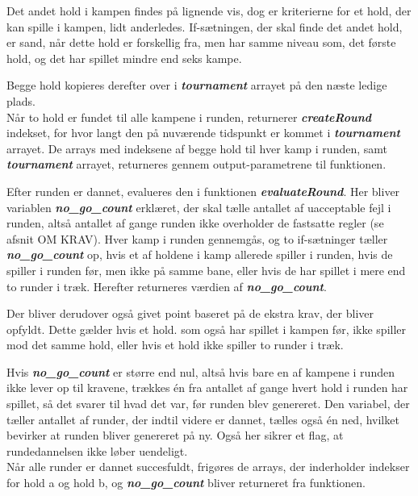 \par
Det andet hold i kampen findes på lignende vis, dog er kriterierne for et hold, der kan spille i kampen, lidt anderledes. If-sætningen, der skal finde det andet hold, er sand, når dette hold er forskellig fra, men har samme niveau som, det første hold, og det har spillet mindre end seks kampe.
\par
Begge hold kopieres derefter over i \textbf{\textit{tournament}} arrayet på den næste ledige plads. \\
Når to hold er fundet til alle kampene i runden, returnerer \textbf{\textit{createRound}} indekset, for hvor langt den på nuværende tidspunkt er kommet i \textbf{\textit{tournament}} arrayet. De arrays med indeksene af begge hold til hver kamp i runden, samt \textbf{\textit{tournament}} arrayet, returneres gennem output-parametrene til funktionen. 
\par
Efter runden er dannet, evalueres den i funktionen \textbf{\textit{evaluateRound}}. Her bliver variablen \textbf{\textit{no\_go\_count}} erklæret, der skal tælle antallet af uacceptable fejl i runden, altså antallet af gange runden ikke overholder de fastsatte regler (se afsnit OM KRAV). Hver kamp i runden gennemgås, og to if-sætninger tæller \textbf{\textit{no\_go\_count}} op, hvis et af holdene i kamp allerede spiller i runden, hvis de spiller i runden før, men ikke på samme bane, eller hvis de har spillet i mere end to runder i træk. Herefter returneres værdien af \textbf{\textit{no\_go\_count}}. 
\par
Der bliver derudover også givet point baseret på de ekstra krav, der bliver opfyldt. Dette gælder hvis et hold. som også har spillet i kampen før, ikke spiller mod det samme hold, eller hvis et hold ikke spiller to runder i træk.
\par
Hvis \textbf{\textit{no\_go\_count}} er større end nul, altså hvis bare en af kampene i runden ikke lever op til kravene, trækkes én fra antallet af gange hvert hold i runden har spillet, så det svarer til hvad det var, før runden blev genereret. Den variabel, der tæller antallet af runder, der indtil videre er dannet, tælles også én ned, hvilket bevirker at runden bliver genereret på ny. Også her sikrer et flag, at rundedannelsen ikke løber uendeligt. \\
Når alle runder er dannet succesfuldt, frigøres de arrays, der inderholder indekser for hold a og hold b, og \textbf{\textit{no\_go\_count}} bliver returneret fra funktionen. 

